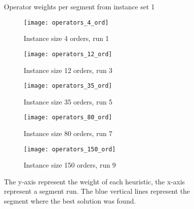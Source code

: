 \documentclass[../main.tex]{subfiles}
\begin{document}
\begin{figure}
    \centering
    \caption{Operator weights per segment from instance set 1}
    \begin{subfigure}[b]{0.45\textwidth}
        \centering
        \texttt{[image: operators\_4\_ord]}
        \caption{Instance size 4 orders, run 1}
        \label{fig:operators4}
    \end{subfigure}
    \hfill
    \begin{subfigure}[b]{0.45\textwidth}
        \centering
        \texttt{[image: operators\_12\_ord]}
        \caption{Instance size 12 orders, run 3}
        \label{fig:operators12}
    \end{subfigure}

    \begin{subfigure}[b]{0.45\textwidth}
        \centering
        \texttt{[image: operators\_35\_ord]}
        \caption{Instance size 35 orders, run 5}
        \label{fig:operators35}
    \end{subfigure}
    \hfill
    \begin{subfigure}[b]{0.45\textwidth}
        \centering
        \texttt{[image: operators\_80\_ord]}
        \caption{Instance size 80 orders, run 7}
        \label{fig:operators80}
    \end{subfigure}

    \begin{subfigure}[b]{0.45\textwidth}
        \centering
        \texttt{[image: operators\_150\_ord]}
        \caption{Instance size 150 orders, run 9}
        \label{fig:operators150}
    \end{subfigure}
    \label{fig:operators}
    \caption*{The y-axis represent the weight of each heuristic, the x-axis represent a segment run. The blue vertical lines represent the segment where the best solution was found.}
\end{figure}
\end{document}
